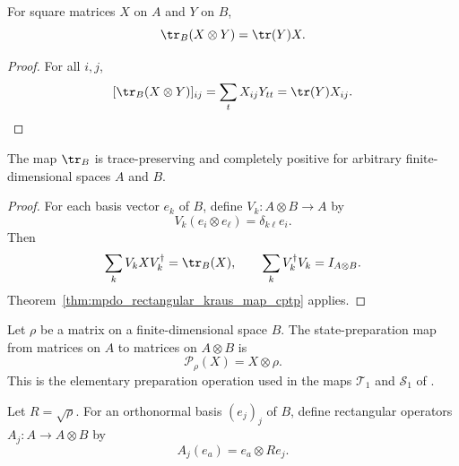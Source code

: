 \begin{theorem}
    \label{thm:mpdo_right_partial_trace_kronecker}
    \leanok
    For square matrices $X$ on $A$ and $Y$ on $B$,
    \[
        \tr_B(X\otimes Y)=\tr(Y)X.
    \]
\end{theorem}
\begin{proof}
    \leanok
    For all $i,j$,
    \[
      [\tr_B(X\otimes Y)]_{ij}
      =\sum_t X_{ij}Y_{tt}=\tr(Y)X_{ij}.
    \]
\end{proof}

\begin{lemma}
    \label{lem:mpdo_right_partial_trace_cptp}
    \leanok
    The map $\tr_{B}$ is trace-preserving and completely positive for arbitrary
    finite-dimensional spaces $A$ and $B$.
\end{lemma}

\begin{proof}
    \leanok
    For each basis vector $e_k$ of $B$, define
    $V_k:A\otimes B\to A$ by
    \[
        V_k(e_i\otimes e_\ell)=\delta_{k\ell}e_i.
    \]
    Then
    \[
        \sum_k V_k X V_k^\dagger=\tr_{B}(X),
        \qquad
        \sum_k V_k^\dagger V_k=I_{A\otimes B}.
    \]
    Theorem~\ref{thm:mpdo_rectangular_kraus_map_cptp} applies.
\end{proof}

\begin{definition}
    \label{def:mpdo_state_preparation_map}
    \leanok
    Let $\rho$ be a matrix on a finite-dimensional space $B$.  The
    state-preparation map from matrices on $A$ to matrices on $A\otimes B$ is
    \[
        \mathcal P_\rho(X)=X\otimes\rho.
    \]
    This is the elementary preparation operation used in the maps
    $\mathcal T_1$ and $\mathcal S_1$ of
    \cite[Appendix~C.2, lines~1527--1533 and~1551--1555]{Cirac2016MPDO_arXiv}.
\end{definition}

\begin{definition}
    \label{def:mpdo_state_preparation_kraus}
    \leanok
    Let $R=\sqrt\rho$. For an orthonormal basis $(e_j)_j$ of $B$, define
    rectangular operators $A_j:A\to A\otimes B$ by
    \[
        A_j(e_a)=e_a\otimes Re_j.
    \]
\end{definition}

